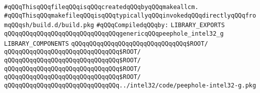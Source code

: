 \label{src/lib/compiler/back/low/lib/intel32-peephole.lib}
\verb|#qQQqThisqQQqfileqQQqisqQQqcreatedqQQqbyqQQqmakeallcm.|\newline
\verb|#qQQqThisqQQqmakefileqQQqisqQQqtypicallyqQQqinvokedqQQqdirectlyqQQqfromqQQqsh/build.d/build.pkg|\newline
\newline
\verb|#qQQqCompiledqQQqby:|\newline
\newline
\verb|LIBRARY_EXPORTS|\newline
\newline
\verb|qQQqqQQqqQQqqQQqqQQqqQQqqQQqqQQqgenericqQQqpeephole_intel32_g|\newline
\newline
\newline
\newline
\verb|LIBRARY_COMPONENTS|\newline
\newline
\verb|qQQqqQQqqQQqqQQqqQQqqQQqqQQqqQQq$ROOT/|\newline
\newline
\verb|qQQqqQQqqQQqqQQqqQQqqQQqqQQqqQQq$ROOT/|\newline
\verb|qQQqqQQqqQQqqQQqqQQqqQQqqQQqqQQq$ROOT/|\newline
\verb|qQQqqQQqqQQqqQQqqQQqqQQqqQQqqQQq$ROOT/|\newline
\verb|qQQqqQQqqQQqqQQqqQQqqQQqqQQqqQQq$ROOT/|\newline
\newline
\verb|qQQqqQQqqQQqqQQqqQQqqQQqqQQqqQQq../intel32/code/peephole-intel32-g.pkg|\newline

